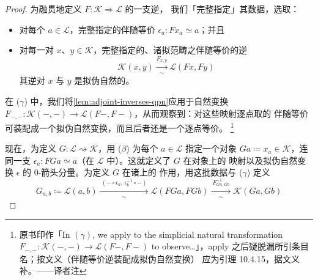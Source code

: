 \begin{proof}
为融贯地定义\trBiequivalence{} $F\colon\mathcal{K}\Rightarrow\mathcal{L}$ 的一支逆，
我们「完整指定」其数据，选取：
\begin{itemize}
\item[($\beta$)] 对每个 $a\in\mathcal{L}$，完整指定的伴随等价
$\epsilon_{a}\colon Fx_{a}\simeq a$；并且
\item[($\gamma$)] 对每一对 $x$、$y\in\mathcal{K}$，完整指定的、诸拟范畴之伴随等价的逆
\begin{equation*}
\mathcal{K}(x,y)\xrightarrow[\ \sim\ ]{F_{x,y}}\mathcal{L}(Fx,Fy)
\end{equation*}
其逆对 $x$ 与 $y$ 是拟伪自然的。
\end{itemize}
在 ($\gamma$) 中，我们将\cref{lem:adjoint-inverses-qpn}应用于\trSimplicial{}自然变换
$F_{-,-}\colon\mathcal{K}(-,-)\to\mathcal{L}(F-,F-)$，从而观察到：对这些映射逐点取的
伴随等价可装配成一个拟伪自然变换，而且后者还是一个逐点等价。
\footnote{原书印作「In $(\gamma)$, we apply to the simplicial natural
transformation $F_{-,-}\colon\mathcal{K}(-,-)\to\mathcal{L}(F-,F-)$ to
observe…」，apply 之后疑脱漏所引条目名；按文义（伴随等价逆装配成拟伪自然变换）
应为引理 10.4.15，据文义补。——译者注}

现在，为定义 $G\colon\mathcal{L}\rightsquigarrow\mathcal{K}$，用 ($\beta$) 为每个
$a\in\mathcal{L}$ 指定一个对象 $Ga\coloneqq x_{a}\in\mathcal{K}$，连同一支\trEquivalence{}
$\epsilon_{a}\colon FGa\simeq a$（在 $\mathcal{L}$ 中）。这就定义了 $G$ 在对象上的
映射以及拟伪自然变换 $\epsilon$ 的 0-箭头分量。为定义 $G$ 在诸\trFunctorSpace{}上的
作用，用这批数据与 ($\gamma$) 定义
\begin{equation*}
G_{a,b}\coloneqq\mathcal{L}(a,b)
\xrightarrow[\ \sim\ ]{\ (-\circ\epsilon_{a},\,\epsilon_{b}^{-1}\circ-)\ }
\mathcal{L}(FGa,FGb)
\xrightarrow[\ \sim\ ]{\ F_{Ga,Gb}^{-1}\ }
\mathcal{K}(Ga,Gb)
\end{equation*}


\end{proof}
